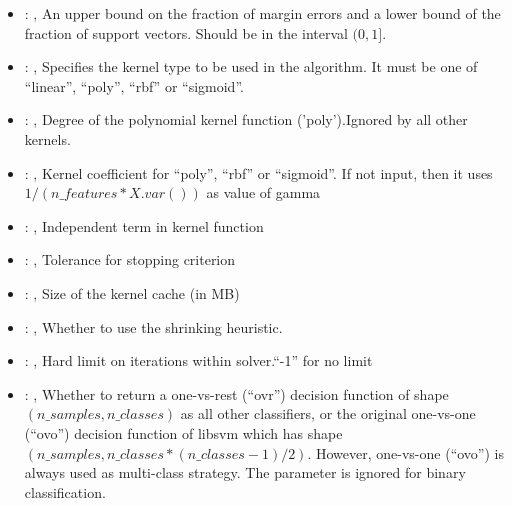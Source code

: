 \begin{itemize}
    \item {}: , 
      An upper bound on the fraction of margin errors and
      a lower bound of the fraction of support vectors. Should be in the interval $(0, 1]$.

    \item {}: , 
      Specifies the kernel type to be used in the algorithm. It must be one of
      ``linear'', ``poly'', ``rbf'' or ``sigmoid''.

    \item {}: , 
      Degree of the polynomial kernel function ('poly').Ignored by all other kernels.

    \item {}: , 
      Kernel coefficient for ``poly'', ``rbf'' or ``sigmoid''. If not input, then it uses
      $1 / (n\_features * X.var())$ as value of gamma

    \item {}: , 
      Independent term in kernel function

    \item {}: , 
      Tolerance for stopping criterion

    \item {}: , 
      Size of the kernel cache (in MB)

    \item {}: , 
      Whether to use the shrinking heuristic.

    \item {}: , 
      Hard limit on iterations within solver.``-1'' for no limit

    \item {}: , 
      Whether to return a one-vs-rest (``ovr'') decision function of shape $(n\_samples, n\_classes)$
      as                                                            all other classifiers, or the
      original one-vs-one (``ovo'') decision function of libsvm which has
      shape $(n\_samples, n\_classes * (n\_classes - 1) / 2)$. However, one-vs-one (``ovo'') is always
      used as                                                            multi-class strategy. The
      parameter is ignored for binary classification.


\end{itemize}
